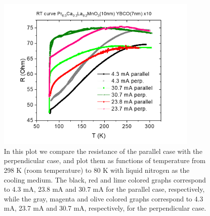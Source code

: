 \documentclass{comjnl}
\begin{document}
\begin{figure}[H]
\centering
\includegraphics[width=100mm]{Bilde2.png}
\caption{In this plot we compare the resistance of the parallel case with the perpendicular case, and plot them as functions of temperature from 298 K (room temperature) to 80 K with liquid nitrogen as the cooling medium. The black, red and lime colored graphs correspond to 4.3 mA, 23.8 mA and 30.7 mA for the parallel case, respectively, while the gray, magenta and olive colored graphs correspond to 4.3 mA, 23.7 mA and 30.7 mA, respectively, for the perpendicular case. \label{fig:res}}
\end{figure}
\end{document}
